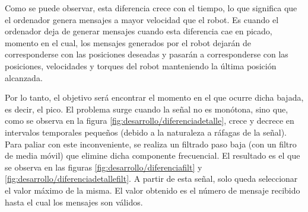 Como se puede observar, esta diferencia crece con el tiempo, lo que significa que el ordenador genera mensajes a mayor velocidad que el robot. Es cuando el ordenador deja de generar mensajes cuando esta diferencia cae en picado, momento en el cual, los mensajes generados por el robot dejarán de corresponderse con las posiciones deseadas y pasarán a corresponderse con las posiciones, velocidades y torques del robot manteniendo la última posición alcanzada.

Por lo tanto, el objetivo será encontrar el momento en el que ocurre dicha bajada, es decir, el pico. El problema surge cuando la señal no es monótona, sino que, como se observa en la figura \ref{fig:desarrollo/diferenciadetalle}, crece y decrece en intervalos temporales pequeños (debido a la naturaleza a ráfagas de la señal). Para paliar con este inconveniente, se realiza un filtrado paso baja (con un filtro de media móvil) que elimine dicha componente frecuencial. El resultado es el que se observa en las figuras \ref{fig:desarrollo/diferenciafilt} y \ref{fig:desarrollo/diferenciadetallefilt}. A partir de esta señal, solo queda seleccionar el valor máximo de la misma. El valor obtenido es el número de mensaje recibido hasta el cual los mensajes son válidos.

